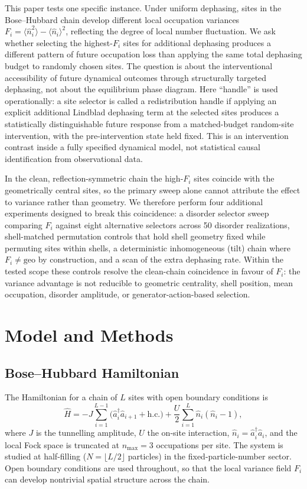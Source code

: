 \documentclass[aps,prresearch,reprint,amsmath,amssymb,longbibliography,floatfix]{revtex4-2}
\newcommand{\Fi}{F_i}
\newcommand{\nop}{\hat{n}}
\newcommand{\adag}{\hat{a}^\dagger}
\newcommand{\aop}{\hat{a}}
\begin{document}
This paper tests one specific instance.
Under uniform dephasing, sites in the Bose--Hubbard chain develop different
local occupation variances $\Fi = \langle\nop_i^2\rangle -
\langle\nop_i\rangle^2$, reflecting the degree of local number
fluctuation.
We ask whether selecting the highest-$\Fi$ sites for additional dephasing
produces a different pattern of future occupation loss than applying the
same total dephasing budget to randomly chosen sites.
The question is about the interventional accessibility of future dynamical
outcomes through structurally targeted dephasing, not about the
equilibrium phase diagram.
Here ``handle'' is used operationally: a site selector is called a
redistribution handle if applying an explicit additional Lindblad
dephasing term at the selected sites produces a statistically
distinguishable future response from a matched-budget random-site
intervention, with the pre-intervention state held fixed.
This is an intervention contrast inside a fully specified dynamical
model, not statistical causal identification from observational data.

In the clean, reflection-symmetric chain the high-$\Fi$ sites coincide with
the geometrically central sites, so the primary sweep alone cannot
attribute the effect to variance rather than geometry.
We therefore perform four additional experiments designed to break this
coincidence: a disorder selector sweep comparing $\Fi$ against eight
alternative selectors across 50 disorder realizations, shell-matched
permutation controls that hold shell geometry fixed while permuting sites
within shells, a deterministic inhomogeneous (tilt) chain where
$\Fi\neq\mathrm{geo}$ by construction, and a scan of the extra dephasing
rate.
Within the tested scope these controls resolve the clean-chain coincidence
in favour of $\Fi$: the variance advantage is not reducible to geometric
centrality, shell position, mean occupation, disorder amplitude, or
generator-action-based selection.

\section{Model and Methods}
\label{sec:methods}

\subsection{Bose--Hubbard Hamiltonian}

The Hamiltonian for a chain of $L$ sites with open boundary conditions is
\begin{equation}
\label{eq:ham}
\hat{H} = -J\sum_{i=1}^{L-1}\bigl(\adag_i\aop_{i+1} + \mathrm{h.c.}\bigr)
         + \frac{U}{2}\sum_{i=1}^{L}\nop_i(\nop_i - 1),
\end{equation}
where $J$ is the tunnelling amplitude, $U$ the on-site interaction,
$\nop_i = \adag_i\aop_i$, and the local Fock space is truncated at
$n_{\max}=3$ occupations per site.
The system is studied at half-filling ($N=\lfloor L/2\rfloor$ particles) in
the fixed-particle-number sector.
Open boundary conditions are used throughout, so that the local variance
field $\Fi$ can develop nontrivial spatial structure across the chain.
\end{document}
